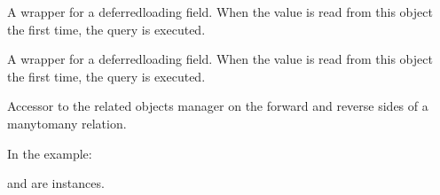 \documentclass[letterpaper,10pt,french]{sphinxmanual}
\begin{document}
\begin{fulllineitems}

\begin{fulllineitems}
\label{\detokenize{main/model:main.models.Semestre.courant}}
\pysigstartsignatures
{}
\pysigstopsignatures
\sphinxAtStartPar
A wrapper for a deferred\sphinxhyphen{}loading field. When the value is read from this
object the first time, the query is executed.

\end{fulllineitems}


\begin{fulllineitems}
\label{\detokenize{main/model:main.models.Semestre.credits}}
\pysigstartsignatures
{}
\pysigstopsignatures
\sphinxAtStartPar
A wrapper for a deferred\sphinxhyphen{}loading field. When the value is read from this
object the first time, the query is executed.

\end{fulllineitems}


\begin{fulllineitems}
\label{\detokenize{main/model:main.models.Semestre.etudiant_set}}
\pysigstartsignatures
{}
\pysigstopsignatures
\sphinxAtStartPar
Accessor to the related objects manager on the forward and reverse sides of
a many\sphinxhyphen{}to\sphinxhyphen{}many relation.

\sphinxAtStartPar
In the example:

\begin{sphinxVerbatim}[commandchars=\\\{\}]
 
       
\end{sphinxVerbatim}

\sphinxAtStartPar
{} and  are 
instances.


\end{fulllineitems}
\end{fulllineitems}
\end{document}
